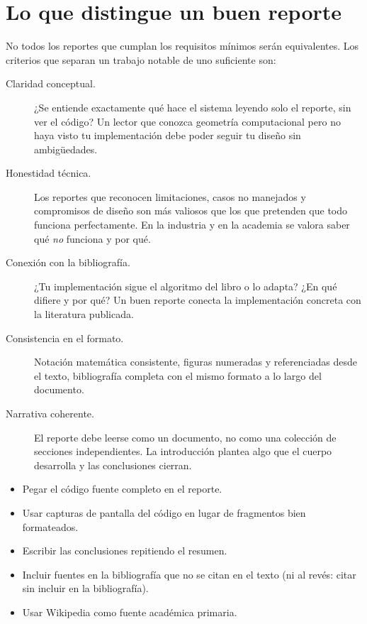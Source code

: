 \documentclass[12pt, oneside]{article}
\begin{document}
\section{Lo que distingue un buen reporte}

No todos los reportes que cumplan los requisitos mínimos serán
equivalentes.  Los criterios que separan un trabajo notable de uno
suficiente son:

\begin{description}
  \item[Claridad conceptual.]
    ¿Se entiende exactamente qué hace el sistema leyendo solo el
    reporte, sin ver el código?  Un lector que conozca geometría
    computacional pero no haya visto tu implementación debe poder
    seguir tu diseño sin ambigüedades.

  \item[Honestidad técnica.]
    Los reportes que reconocen limitaciones, casos no manejados y
    compromisos de diseño son más valiosos que los que pretenden que
    todo funciona perfectamente.  En la industria y en la academia
    se valora saber qué \textit{no} funciona y por qué.

  \item[Conexión con la bibliografía.]
    ¿Tu implementación sigue el algoritmo del libro o lo adapta?
    ¿En qué difiere y por qué?  Un buen reporte conecta la
    implementación concreta con la literatura publicada.

  \item[Consistencia en el formato.]
    Notación matemática consistente, figuras numeradas y referenciadas
    desde el texto, bibliografía completa con el mismo formato a lo
    largo del documento.

  \item[Narrativa coherente.]
    El reporte debe leerse como un documento, no como una colección
    de secciones independientes.  La introducción plantea algo que
    el cuerpo desarrolla y las conclusiones cierran.
\end{description}

\begin{advertencia}
  \begin{itemize}
    \item Pegar el código fuente completo en el reporte.
    \item Usar capturas de pantalla del código en lugar de fragmentos
          bien formateados.
    \item Escribir las conclusiones repitiendo el resumen.
    \item Incluir fuentes en la bibliografía que no se citan en
          el texto (ni al revés: citar sin incluir en la bibliografía).
    \item Usar Wikipedia como fuente académica primaria.
  \end{itemize}
\end{advertencia}
\end{document}
